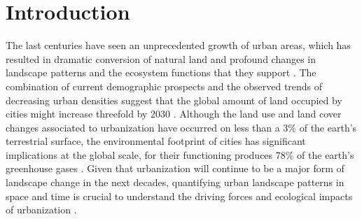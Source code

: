 \section*{Introduction}

The last centuries have seen an unprecedented growth of urban areas, which has resulted in dramatic conversion of natural land and profound changes in landscape patterns and the ecosystem functions that they support \citep{alberti2005effects}.
The combination of current demographic prospects and the observed trends of decreasing urban densities suggest that the global amount of land occupied by cities might increase threefold by 2030 \citep{angel2005dynamics}.
Although the land use and land cover changes associated to urbanization have occurred on less than a 3\% of the earth's terrestrial surface, the environmental footprint of cities has significant implications at the global scale, for their functioning produces 78\% of the earth's greenhouse gases \cite{grimm2008global}.
Given that urbanization will continue to be a major form of landscape change in the next decades, quantifying urban landscape patterns in space and time is crucial to understand the driving forces and ecological impacts of urbanization \citep{wu2014urban}. 

